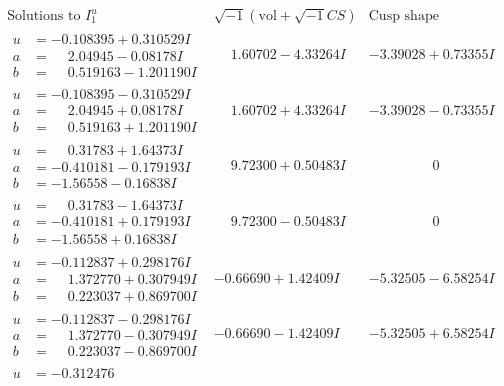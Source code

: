 \documentclass[1p]{elsarticle_modified}
\theoremstyle{definition}
\newcommand{\I}{\sqrt{-1}}
\begin{document}
$$\begin{array}{c|c|c}
\text{Solutions to }I^u_{1}& \I (\text{vol} + \sqrt{-1}CS) & \text{Cusp shape}\\
 \hline 
\begin{aligned}
u &= -0.108395 + 0.310529 I \\
a &= \phantom{-}2.04945 - 0.08178 I \\
b &= \phantom{-}0.519163 - 1.201190 I\end{aligned}
 & \phantom{-}1.60702 - 4.33264 I & -3.39028 + 0.73355 I \\ \hline\begin{aligned}
u &= -0.108395 - 0.310529 I \\
a &= \phantom{-}2.04945 + 0.08178 I \\
b &= \phantom{-}0.519163 + 1.201190 I\end{aligned}
 & \phantom{-}1.60702 + 4.33264 I & -3.39028 - 0.73355 I \\ \hline\begin{aligned}
u &= \phantom{-}0.31783 + 1.64373 I \\
a &= -0.410181 - 0.179193 I \\
b &= -1.56558 - 0.16838 I\end{aligned}
 & \phantom{-}9.72300 + 0.50483 I & \phantom{-0.000000 } 0 \\ \hline\begin{aligned}
u &= \phantom{-}0.31783 - 1.64373 I \\
a &= -0.410181 + 0.179193 I \\
b &= -1.56558 + 0.16838 I\end{aligned}
 & \phantom{-}9.72300 - 0.50483 I & \phantom{-0.000000 } 0 \\ \hline\begin{aligned}
u &= -0.112837 + 0.298176 I \\
a &= \phantom{-}1.372770 + 0.307949 I \\
b &= \phantom{-}0.223037 + 0.869700 I\end{aligned}
 & -0.66690 + 1.42409 I & -5.32505 - 6.58254 I \\ \hline\begin{aligned}
u &= -0.112837 - 0.298176 I \\
a &= \phantom{-}1.372770 - 0.307949 I \\
b &= \phantom{-}0.223037 - 0.869700 I\end{aligned}
 & -0.66690 - 1.42409 I & -5.32505 + 6.58254 I \\ \hline\begin{aligned}
u &= -0.312476\phantom{ +0.000000I} \\

\end{aligned}
\end{array}$$
\end{document}

